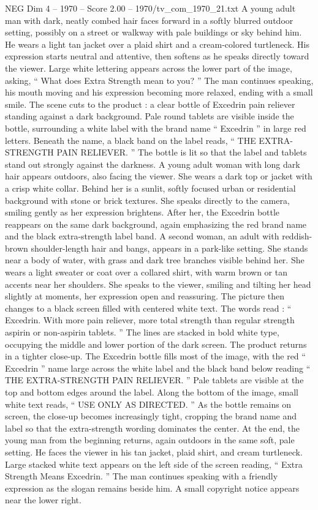 \begin{textsample}{NEG Dim 4 – 1970 – Score 2.00 – 1970/tv\_com\_1970\_21.txt}  \label{ex:f4_neg_017}
A young adult man with dark, neatly combed hair faces forward in a softly blurred outdoor setting, possibly on a street or walkway with pale buildings or sky behind him.
He wears a light tan jacket over a plaid shirt and a cream-colored turtleneck.
His expression starts neutral and attentive, then softens as he speaks directly toward the viewer.
Large white lettering appears across the lower part of the image, asking, “ What does Extra Strength mean to you? ” The man continues speaking, his mouth moving and his expression becoming more relaxed, ending with a small smile.
The scene cuts to the product : a clear bottle of Excedrin pain reliever standing against a dark background.
Pale round tablets are visible inside the bottle, surrounding a white label with the brand name “ Excedrin ” in large red letters.
Beneath the name, a black band on the label reads, “ THE EXTRA-STRENGTH PAIN RELIEVER. ” The bottle is lit so that the label and tablets stand out strongly against the darkness.
A young adult woman with long dark hair appears outdoors, also facing the viewer.
She wears a dark top or jacket with a crisp white collar.
Behind her is a sunlit, softly focused urban or residential background with stone or brick textures.
She speaks directly to the camera, smiling gently as her expression brightens.
After her, the Excedrin bottle reappears on the same dark background, again emphasizing the red brand name and the black extra-strength label band.
A second woman, an adult with reddish-brown shoulder-length hair and bangs, appears in a park-like setting.
She stands near a body of water, with grass and dark tree branches visible behind her.
She wears a light sweater or coat over a collared shirt, with warm brown or tan accents near her shoulders.
She speaks to the viewer, smiling and tilting her head slightly at moments, her expression open and reassuring.
The picture then changes to a black screen filled with centered white text.
The words read : “ Excedrin.
With more pain reliever, more total strength than regular strength aspirin or non-aspirin tablets. ” The lines are stacked in bold white type, occupying the middle and lower portion of the dark screen.
The product returns in a tighter close-up.
The Excedrin bottle fills most of the image, with the red “ Excedrin ” name large across the white label and the black band below reading “ THE EXTRA-STRENGTH PAIN RELIEVER. ” Pale tablets are visible at the top and bottom edges around the label.
Along the bottom of the image, small white text reads, “ USE ONLY AS DIRECTED. ” As the bottle remains on screen, the close-up becomes increasingly tight, cropping the brand name and label so that the extra-strength wording dominates the center.
At the end, the young man from the beginning returns, again outdoors in the same soft, pale setting.
He faces the viewer in his tan jacket, plaid shirt, and cream turtleneck.
Large stacked white text appears on the left side of the screen reading, “ Extra Strength Means Excedrin. ” The man continues speaking with a friendly expression as the slogan remains beside him.
A small copyright notice appears near the lower right.

\end{textsample}
